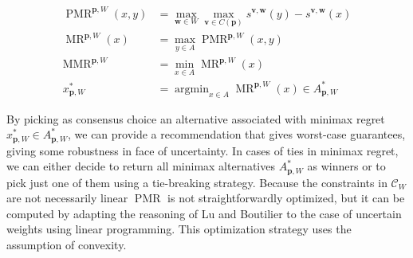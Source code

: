 \documentclass[a4paper,twoside]{article}
\newcommand{\profile}{\bm{v}}%
\newcommand{\pprofile}{{\bm{p}}}%
\newcommand{\w}{\bm{w}}
\newcommand{\Co}{\mathcal{C}}
\DeclareMathOperator{\Regret}{Regret}
\DeclareMathOperator{\PMR}{PMR}
\DeclareMathOperator{\MR}{MR}
\DeclareMathOperator{\MMR}{MMR}
\DeclareMathOperator*{\argmin}{argmin}
\begin{document}
\begin{align}
\PMR^{\pprofile,W}(x,y) & = \max_{\w \in W} \max_{\profile \in C(\pprofile)}s^{\profile,\w}(y) - s^{\profile, \w}(x) \\
\MR^{\pprofile,W}(x) & = \max_{y \in A} \PMR^{\pprofile,W}(x,y)\\
\MMR^{\pprofile,W} & = \min_{x \in A} \MR^{\pprofile,W}(x) \\
x^{*}_{\pprofile,W} & = \argmin_{x \in A}\MR^{\pprofile,W}(x) \in A^*_{\pprofile, W}
\end{align}

By picking as consensus choice an alternative associated with minimax regret $x^*_{\pprofile, W} \in A^*_{\pprofile, W} $, we can provide a recommendation that gives worst-case guarantees, giving some robustness in face of uncertainty. 
In cases of ties in minimax regret, we can either decide to return all minimax alternatives $A^*_{\pprofile, W}$ as winners or to pick just one of them using a tie-breaking strategy.
Because the constraints in $\Co_W$ are not necessarily linear $\PMR$ is not straightforwardly optimized, but it can be computed by adapting the reasoning of Lu and Boutilier \cite{Lu2011} to the case of uncertain weights using linear programming. This optimization strategy uses the assumption of convexity.
%
%
\end{document}
